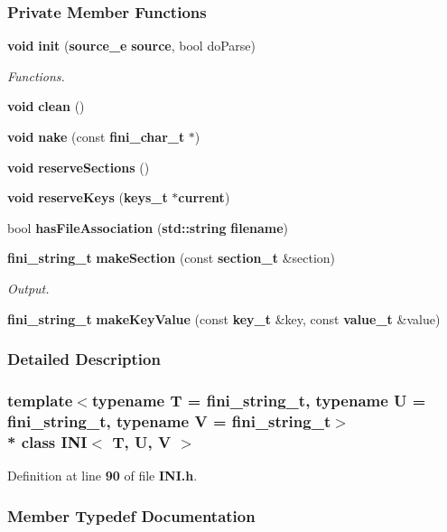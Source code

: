 \subsubsection*{Private Member Functions}
\begin{DoxyCompactItemize}
\item 
{\bf void} {\bf init} ({\bf source\+\_\+e} {\bf source}, bool do\+Parse)
\begin{DoxyCompactList}\small\item\em Functions. \end{DoxyCompactList}\item 
{\bf void} {\bf clean} ()
\item 
{\bf void} {\bf nake} (const {\bf fini\+\_\+char\+\_\+t} $\ast$)
\item 
{\bf void} {\bf reserve\+Sections} ()
\item 
{\bf void} {\bf reserve\+Keys} ({\bf keys\+\_\+t} $\ast${\bf current})
\item 
bool {\bf has\+File\+Association} ({\bf std\+::string} {\bf filename})
\item 
{\bf fini\+\_\+string\+\_\+t} {\bf make\+Section} (const {\bf section\+\_\+t} \&section)
\begin{DoxyCompactList}\small\item\em Output. \end{DoxyCompactList}\item 
{\bf fini\+\_\+string\+\_\+t} {\bf make\+Key\+Value} (const {\bf key\+\_\+t} \&key, const {\bf value\+\_\+t} \&value)
\end{DoxyCompactItemize}


\subsubsection{Detailed Description}
\subsubsection*{template$<$typename T = fini\+\_\+string\+\_\+t, typename U = fini\+\_\+string\+\_\+t, typename V = fini\+\_\+string\+\_\+t$>$\\*
class I\+N\+I$<$ T, U, V $>$}



Definition at line {\bf 90} of file {\bf I\+N\+I.\+h}.



\subsubsection{Member Typedef Documentation}
